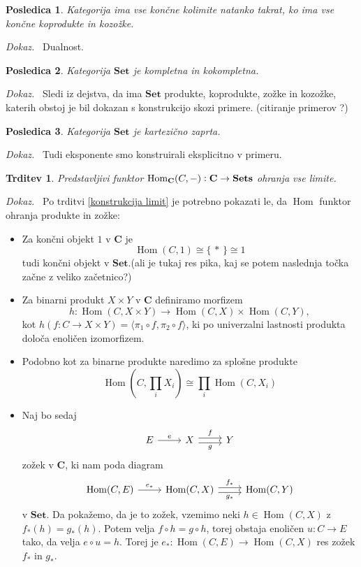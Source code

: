 \documentclass[12pt,a4paper]{book}
\theoremstyle{definition}
\theoremstyle{plain}
\newtheorem{trditev}[definicija]{Trditev}
\newtheorem{posledica}{Posledica}[definicija]
\newenvironment{dokaz}{\emph{Dokaz.}\ }{\hspace{\fill}{$\Box$}}
\theoremstyle{definition}
\theoremstyle{remark}
\newcommand{\cat}[1]{\textbf{#1}}
\DeclareMathOperator{\Hom}{Hom}
\renewcommand{\set}[1]{\{\,#1\,\}}
\begin{document}
\begin{posledica}
Kategorija ima vse končne kolimite natanko takrat, ko ima vse končne koprodukte in kozožke.
\end{posledica}
\begin{dokaz}
Dualnost.
\end{dokaz}

\begin{posledica}
Kategorija $\cat{Set}$ je kompletna in kokompletna.
\end{posledica}
\begin{dokaz}
Sledi iz dejstva, da ima $\cat{Set}$ produkte, koprodukte, zožke in kozožke, katerih obstoj je bil dokazan s konstrukcijo skozi primere. (citiranje primerov ?)
\end{dokaz}

\begin{posledica}
Kategorija $\cat{Set}$ je kartezično zaprta.
\end{posledica}
\begin{dokaz}
Tudi eksponente smo konstruirali eksplicitno v primeru.
\end{dokaz}
 
\begin{trditev} Predstavljivi funktor $\Hom_{\bf{C}}(C,-): \bf{C} \to \bf{Sets}$ ohranja vse limite.
\end{trditev}
\begin{dokaz}
Po trditvi \ref{konstrukcija limit} je potrebno pokazati le, da $\Hom$ funktor ohranja produkte in zožke:
%
\begin{itemize}
\item Za končni objekt $1$ v $\cat{C}$ je 
$$\Hom(C,1) \cong \set{*} \cong 1$$
tudi končni objekt v $\cat{Set}.$(ali je tukaj res pika, kaj se potem naslednja točka začne z veliko začetnico?)
\item Za binarni produkt $X \times Y$ v $\cat{C}$ definiramo morfizem 
$$h : \Hom(C, X \times Y) \to \Hom(C,X) \times \Hom(C,Y),$$
kot $h(f : C \to X \times Y) = \langle \pi_1 \circ f, \pi_2 \circ f \rangle$, ki po univerzalni lastnosti produkta določa enoličen izomorfizem.
\item Podobno kot za binarne produkte naredimo za splošne produkte
$$\Hom(C, \prod_i X_i) \cong \prod_i \Hom(C, X_i)$$
\item Naj bo sedaj
$$ \begin{tikzcd}[sep=normal]
E \ar[r, "e"] & X \ar[r, shift left, "f"] \ar[r, shift right, "g"'] & Y
\end{tikzcd} $$
zožek v $\cat{C}$, ki nam poda diagram
$$ \begin{tikzcd}[sep=normal]
\Hom(C,E) \ar[r, "e_*"] & \Hom(C,X) \ar[r, shift left, "f_*"] \ar[r, shift right, "g_*"'] & \Hom(C,Y)
\end{tikzcd} $$
v $\cat{Set}$. Da pokažemo, da je to zožek, vzemimo neki $h \in \Hom(C,X)$ z $f_*(h) = g_*(h)$. Potem velja $f \circ h = g \circ h$, torej obstaja enoličen $u : C \to E$ tako, da velja $e \circ u = h$. Torej je $e_* : \Hom(C,E) \to \Hom(C,X)$ res zožek $f_*$ in $g_*$.
\end{itemize}

\end{dokaz}
\end{document}
